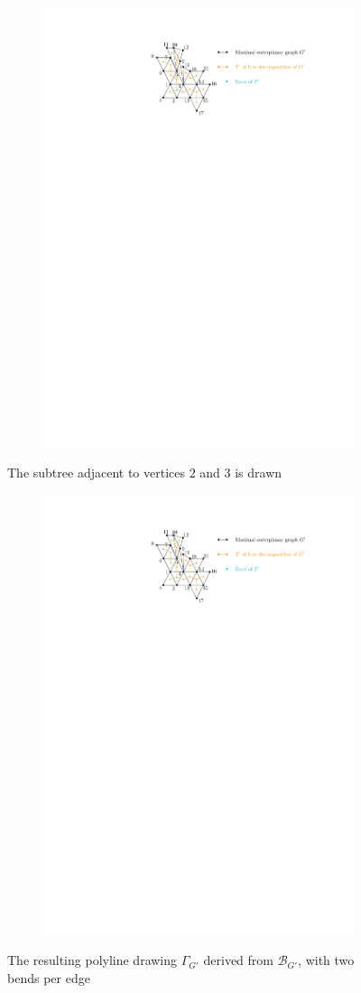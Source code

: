 \begin{figure}[H]
	\centering
	\begin{subfigure}{\textwidth}
		\centering
		\includegraphics[page=7,width=0.7\linewidth]{graphics/maximal_outerplanar_example_drawings.pdf}
	\end{subfigure}
	\caption{The subtree adjacent to vertices $2$ and $3$ is drawn}\label{im:example_drawing_box_G}
\end{figure}


\begin{figure}[H]
	\centering
	\begin{subfigure}{\textwidth}
		\centering
		\includegraphics[page=8,width=0.5\linewidth]{graphics/maximal_outerplanar_example_drawings.pdf}
	\end{subfigure}
	\caption{The resulting polyline drawing $\Gamma_{G'}$ derived from $\mathcal{B}_{G'}$, with two bends per edge}\label{im:example_drawing_gamma_G}
\end{figure}
